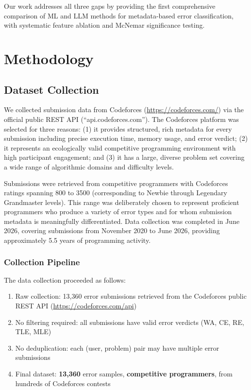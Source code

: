 \documentclass[10pt,letterpaper]{article}
\begin{document}
Our work addresses all three gaps by providing the first comprehensive comparison
of ML and LLM methods for metadata-based error classification, with systematic
feature ablation and McNemar significance testing.

\section{Methodology}

\subsection{Dataset Collection}

We collected submission data from Codeforces (\url{https://codeforces.com/})
via the official public REST API (``api.codeforces.com''). The Codeforces
platform was selected for three reasons: (1) it provides structured, rich
metadata for every submission including precise execution time, memory usage,
and error verdict; (2) it represents an ecologically valid competitive
programming environment with high participant engagement; and (3) it has a
large, diverse problem set covering a wide range of algorithmic domains and
difficulty levels.

Submissions were retrieved from competitive programmers with Codeforces
ratings spanning 800 to 3500 (corresponding to Newbie through Legendary
Grandmaster levels). This range was deliberately chosen to represent
proficient programmers who produce a variety of error types and for whom
submission metadata is meaningfully differentiated. Data collection was
completed in June 2026, covering submissions from November 2020 to June
2026, providing approximately 5.5 years of programming activity.

\subsubsection*{Collection Pipeline}
The data collection proceeded as follows:
\begin{enumerate}
    \item Raw collection: 13,360 error submissions retrieved from the Codeforces public REST API (\url{https://codeforces.com/api})
    \item No filtering required: all submissions have valid error verdicts (WA, CE, RE, TLE, MLE)
    \item No deduplication: each (user, problem) pair may have multiple error submissions
    \item Final dataset: \textbf{13,360} error samples, \textbf{competitive programmers}, from hundreds of Codeforces contests
\end{enumerate}
\end{document}
